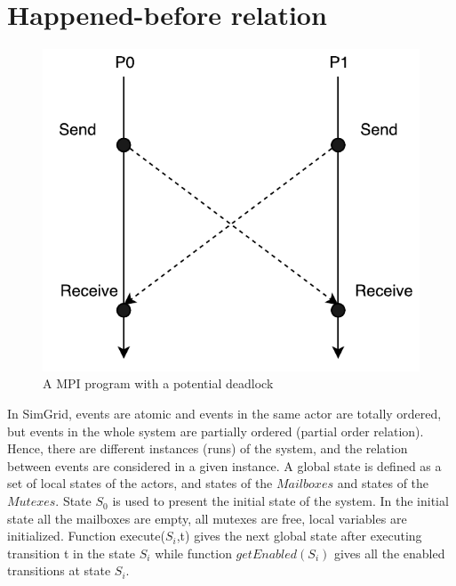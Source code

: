 \documentclass[a4paper,11pt]{article}
\begin{document}
\section{Happened-before relation}
\begin{figure}[H]
	\label{fig:cycle_dependency}
	\begin{center}
		\centerline{\includegraphics[scale=.8]{example.pdf}}

	\end{center}
	\caption{A MPI program with a potential deadlock}
\end{figure}
In SimGrid, events are atomic and events in the same actor are totally ordered, but events in the whole system are partially ordered (partial order relation).  Hence, there are different instances (runs) of the system, and the relation between events are  considered in a given instance. A global state is defined as a set of local states of the actors, and states of the $Mailboxes$ and states of the $Mutexes$. State $S_0$ is used to present the initial state of the system. In the initial state all the mailboxes are empty, all mutexes are free, local variables are initialized. Function execute($S_i$,t)  gives the next global state after executing transition t in the state $S_i$ while function $getEnabled(S_i)$
gives all the enabled transitions at state $S_i$.\\
\end{document}
